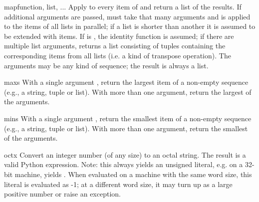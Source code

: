 \begin{funcdesc}{map}{function, list, ...}
Apply  to every item of  and return a list
of the results.  If additional  arguments are passed, 
 must take that many arguments and is applied to
the items of all lists in parallel; if a list is shorter than another
it is assumed to be extended with  items.  If
 is , the identity function is assumed; if
there are multiple list arguments,  returns a list
consisting of tuples containing the corresponding items from all lists
(i.e. a kind of transpose operation).  The  arguments may be
any kind of sequence; the result is always a list.
\end{funcdesc}

\begin{funcdesc}{max}{s}
With a single argument , return the largest item of a
non-empty sequence (e.g., a string, tuple or list).  With more than
one argument, return the largest of the arguments.
\end{funcdesc}

\begin{funcdesc}{min}{s}
With a single argument , return the smallest item of a
non-empty sequence (e.g., a string, tuple or list).  With more than
one argument, return the smallest of the arguments.
\end{funcdesc}

\begin{funcdesc}{oct}{x}
  Convert an integer number (of any size) to an octal string.  The
  result is a valid Python expression.  Note: this always yields
  an unsigned literal, e.g. on a 32-bit machine,  yields
  .  When evaluated on a machine with the same
  word size, this literal is evaluated as -1; at a different word
  size, it may turn up as a large positive number or raise an
   exception.
\end{funcdesc}


